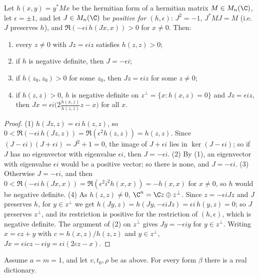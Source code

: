 \begin{lemma}\label{pf:ks2:jline}
Let $h(x,y)=y^*Mx$ be the hermitian form of a hermitian matrix $M\in M_n(\C)$, let $\epsilon=\pm1$,
and let $J\in M_n(\C)$ be \emph{positive for $(h,\epsilon)$}: $J^2=-1$, $J^*MJ=M$ (i.e.\ $J$ preserves
$h$), and $\Re(-\epsilon i\,h(Jx,x))>0$ for $x\ne0$. Then:
\begin{enumerate}
\item every $z\ne0$ with $Jz=\epsilon iz$ satisfies $h(z,z)>0$;
\item if $h$ is negative definite, then $J=-\epsilon i$;
\item if $h(z_0,z_0)>0$ for some $z_0$, then $Jz=\epsilon iz$ for some $z\ne0$;
\item if $h(z,z)>0$, $h$ is negative definite on $z^\perp=\{x:h(x,z)=0\}$ and $Jz=\epsilon iz$, then
  $Jx=\epsilon i\bigl(2\frac{h(x,z)}{h(z,z)}z-x\bigr)$ for all $x$.
\end{enumerate}
\end{lemma}

\begin{proof}
(1) $h(Jz,z)=\epsilon i\,h(z,z)$, so $0<\Re(-\epsilon i\,h(Jz,z))=\Re(\epsilon^2h(z,z))=h(z,z)$. Since
$(J-\epsilon i)(J+\epsilon i)=J^2+1=0$, the image of $J+\epsilon i$ lies in $\ker(J-\epsilon i)$; so if
$J$ has no eigenvector with eigenvalue $\epsilon i$, then $J=-\epsilon i$. (2) By (1), an eigenvector
with eigenvalue $\epsilon i$ would be a positive vector; so there is none, and $J=-\epsilon i$. (3)
Otherwise $J=-\epsilon i$, and then $0<\Re(-\epsilon i\,h(Jx,x))=\Re(\epsilon^2i^2h(x,x))=-h(x,x)$ for
$x\ne0$, so $h$ would be negative definite. (4) As $h(z,z)\ne0$, $\C^n=\C z\oplus z^\perp$. Since
$z=-\epsilon iJz$ and $J$ preserves $h$, for $y\in z^\perp$ we get $h(Jy,z)=h(Jy,-\epsilon
iJz)=\epsilon i\,h(y,z)=0$; so $J$ preserves $z^\perp$, and its restriction is positive for the
restriction of $(h,\epsilon)$, which is negative definite. The argument of (2) on $z^\perp$ gives
$Jy=-\epsilon iy$ for $y\in z^\perp$. Writing $x=cz+y$ with $c=h(x,z)/h(z,z)$ and $y\in z^\perp$,
$Jx=\epsilon icz-\epsilon iy=\epsilon i(2cz-x)$.
\end{proof}

\begin{proposition}\label{pf:ks2:rdic}
Assume $a=m=1$, and let $v,t_0,\rho$ be as above. For every form $\beta$ there is a real dictionary.
\end{proposition}

